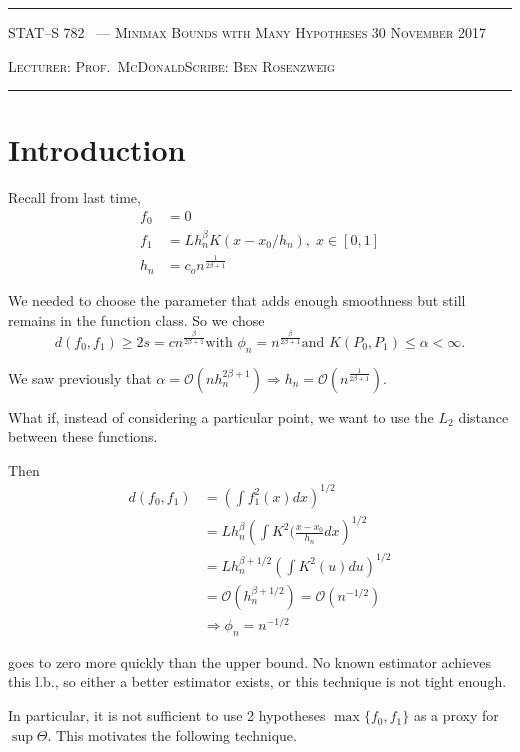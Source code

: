 \documentclass[10pt]{article}
\newcounter{lecnum}
\renewcommand{\O}{\ensuremath{\mathcal{O}}}
\newcommand{\lecturer}{Prof.\ McDonald}
\newcommand{\scribe}{Ben Rosenzweig}
\newcommand{\chtitle}{Minimax Bounds with Many Hypotheses}
\newcommand{\lecdate}{30 November 2017}
\begin{document}
\rule{6.5in}{1pt}

\textsc{STAT--S 782
        \hfill \thelecnum\ --- \chtitle
        \hfill \lecdate}

\textsc{Lecturer: \lecturer \hfill Scribe: \scribe}
\rule{6.5in}{1pt}

\section{Introduction}
Recall from last time,
\begin{align*}
f_0&=0\\
f_1 &= Lh_n^\beta K(x-x_0 / h_n),\; x\in[0,1]\\
h_n &= c_o n^{\frac{1}{2\beta+1}}
\end{align*}

We needed to choose the parameter that adds enough smoothness but still remains in the function class.
So we chose 
\[
d(f_0,f_1) \geq 2s = cn^{\frac{\beta}{2\beta+1}}\text{with $\phi_n = n^{\frac{\beta}{2\beta+1}}$
and $K(P_0,P_1)\leq\alpha<\infty$.} 
\]

We saw previously that $\alpha=\O(nh_n^{2\beta+1}) \Rightarrow h_n=\O( n^{\frac{1}{2\beta+1}} )$.

What if, instead of considering a particular point, we want to use the $L_2$ distance between these functions. 

Then 
\begin{align*}
d(f_0,f_1) &= \left(
		\int f_1^2(x)dx
	\right)^{1/2} \\
&= Lh_n^\beta
	\left(
		\int K^2(\frac{x-x_0}{h_n}dx
		\right)^{1/2}\\
&= Lh_n^{\beta+1/2} 
	\left(
		\int K^2(u)du
	\right)^{1/2}\\
&=\O(h_n^{\beta+1/2})=\O(n^{-1/2})\\
&\Rightarrow \phi_n = n^{-1/2}
\end{align*}

goes to zero more quickly than the upper bound.  No known estimator achieves this l.b., so either a better estimator exists, or this technique is not tight enough.
  
In particular, it is not sufficient to use 2 hypotheses $\max\{f_0,f_1\}$ as a proxy for $\sup\Theta.$
This motivates the following technique.
\end{document}
